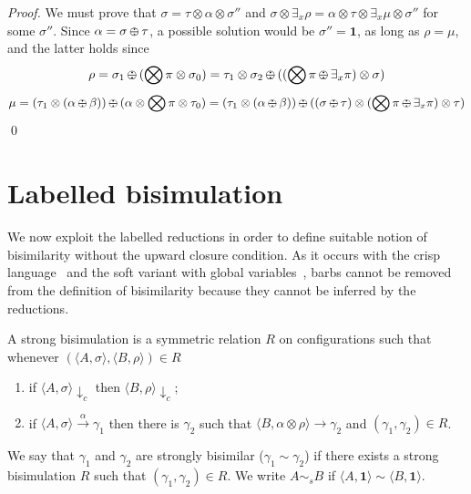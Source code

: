 \documentclass{llncs}
\def\monid{{\mathbf 0}}
\def\odiv{\, {\ominus\hspace{-7.7pt} \div} \,}
\def\monid{\mathbf{1}}
\begin{document}
\begin{proof}
{\noindent
We must prove that $\sigma = \tau \otimes \alpha \otimes \sigma''$ and 
$\sigma \otimes \exists_x \rho = \alpha \otimes \tau \otimes \exists_x \mu \otimes \sigma''$ for some $\sigma''$.
Since $\alpha = \sigma \odiv \tau$, a possible solution would be $\sigma'' = \monid$,
as long as $\rho = \mu$,
and the latter holds since
$$\rho = \sigma_1 \odiv (\bigotimes \pi  \otimes \sigma_0) = \tau_1 \otimes \sigma_2 \odiv ((\bigotimes \pi  \odiv \exists_x \pi) \otimes \sigma)$$
$$\mu = (\tau_1 \otimes (\alpha \odiv \beta)) \odiv (\alpha \otimes \bigotimes \pi  \otimes \tau_0) = 
(\tau_1 \otimes (\alpha \odiv \beta)) \odiv ((\sigma \odiv \tau) \otimes (\bigotimes \pi  \odiv \exists_x \pi)  \otimes \tau)$$
}
\qed
\end{proof}


\section{Labelled bisimulation}
We now exploit the labelled reductions in order to define suitable notion of bisimilarity without the upward closure condition.
As it occurs with the crisp language~\cite{pippo} and the soft variant with global variables~\cite{festcatuscia}, 
barbs cannot be removed from the 
definition of bisimilarity because they cannot be inferred by the reductions.

\begin{definition}\label{def:strongbis} A strong bisimulation is a symmetric relation $R$ on configurations such that whenever
$( \langle A, \sigma \rangle,\langle B, \rho \rangle) \in R$
\begin{enumerate}
\item if $\langle A, \sigma \rangle \downarrow_c$ then $\langle B, \rho \rangle \downarrow_c$;
\item if $\langle A, \sigma \rangle \xrightarrow{\alpha} \gamma_1$ then there is $\gamma_2$ such that $\langle B, \alpha \otimes \rho \rangle \to \gamma_2$ 
and $(\gamma_1, \gamma_2) \in R$.
\end{enumerate}
We say that $\gamma_1$ and $\gamma_2$ are  strongly bisimilar ($\gamma_1  \sim \gamma_2$) if there exists a strong  bisimulation 
$R$ such that $(\gamma_1 , \gamma_2 ) \in R$. We write $A \sim_{\mathit{s}} B$ if $\langle A, \monid \rangle \sim \langle B, \monid \rangle$.
\end{definition}
\end{document}

